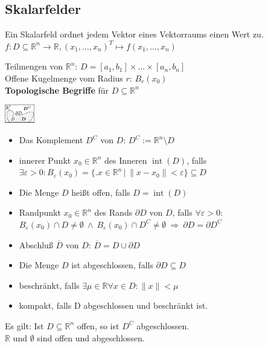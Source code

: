 \documentclass[6pt,a4paper]{scrartcl}
\newcommand{\iset}[2]{\ensuremath{\bigl\{ \bigl. #1 \, \bigr| \, #2 \bigr\}}}					%
\newcommand{\norm}[1]{\ensuremath{\|#1\|}}														%
\newcommand{\inn}{\operatorname{int}}
\renewcommand{\emph}[1]{\textbf{#1}}															%
\newcommand{\ol}[1]{\ensuremath{\overline{#1}}}									%
\newcommand{\R}{\ensuremath{\mathbb R}}
\begin{document}
\begin{multicols*}{4}
\section{Skalarfelder}
Ein Skalarfeld ordnet jedem Vektor eines Vektorraums einen Wert zu.\\
$ f:D\subseteq \mathbb R^n \rightarrow \mathbb R, (x_1,\ldots ,x_n)^T \mapsto f(x_1,\ldots ,x_n) $
\parbox{5.5cm}{
Teilmengen von $\mathbb R^n$: $D = [a_1,b_1] \times ... \times [a_n,b_n]$\\
Offene Kugelmenge vom Radius $r$: $B_r(x_0)$\\
\emph{Topologische Begriffe} für $D \subseteq \mathbb R^n$ } \parbox{1.0cm}{ \includegraphics[height=0.8cm]{img/topologie.pdf} }
\begin{itemize}\itemsep-1pt
	\item Das Komplement $D^C$ von $D$: $D^C := \R^n \setminus D$
	\item innerer Punkt $x_0 \in \mathbb R^n$ des Inneren $\inn(D)$, falls \\
		$\exists \varepsilon > 0: B_\varepsilon (x_0) = \iset{x\in \mathbb R^n}{\norm{x-x_0} < \varepsilon} \subseteq D$
	\item Die Menge $D$ heißt offen, falls $D=\inn(D)$
	\item Randpunkt $x_0 \in \mathbb R^n$ des Rands $\partial D$ von $D$, falls $\forall \varepsilon > 0:$ \\ 
		$B_\varepsilon(x_0) \cap D \ne \emptyset \ \land \ B_\varepsilon(x_0) \cap D^C \ne \emptyset \ \Rightarrow \ \partial D = \partial D^C$
	\item Abschluß $\ol D$ von $D$: $\overline{D}=D \cup \partial D$
	\item Die Menge $D$ ist abgeschlossen, falls $\partial D \subseteq D$
	\item beschränkt, falls $\exists \mu \in \mathbb R \forall x \in D: \norm{x} < \mu$
	\item kompakt, falls D abgeschlossen und beschränkt ist. 
\end{itemize}
Es gilt: Ist $D \subseteq \mathbb R^n$ offen, so ist $D^C$ abgeschlossen. \\
$\mathbb R$ und $\emptyset$ sind offen und abgeschlossen.


\end{multicols*}
\end{document}
